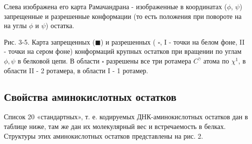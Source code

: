 \documentclass[
11pt,%
tightenlines,%
twoside,%
onecolumn,%
nofloats,%
nobibnotes,%
nofootinbib,%
superscriptaddress,%
noshowpacs,%
centertags]%
{revtex4}
\begin{document}
Слева изображена его карта Рамачандрана - изображенные в координатах ($\phi$, $\psi$) запрещенные и разрешенные конформации (то есть положения при повороте на на углы $\phi$ и $\psi$) остатка. 


Рис. 3-5. Карта запрещенных ($\blacksquare$) и разрешенных ( $\square$, I - точки на белом фоне, II - точки на сером фоне) конформаций крупных остатков при вращении по углам $\phi, \psi$ в белковой цепи. В области $\square$ разрешены все три ротамера $C^{\gamma}$ атома по $\chi^{1}$, в области II - 2 ротамера, в области I - 1 ротамер.
\newpage
\subsection{Свойства аминокислотных остатков}
Список 20 «стандартных», т. е. кодируемых ДНК-аминокислотных остатков дан в таблице ниже, там же дан их молекулярный вес и встречаемость в белках. Структуры этих аминокислотных остатков представлены на рис. 2.
\end{document}
